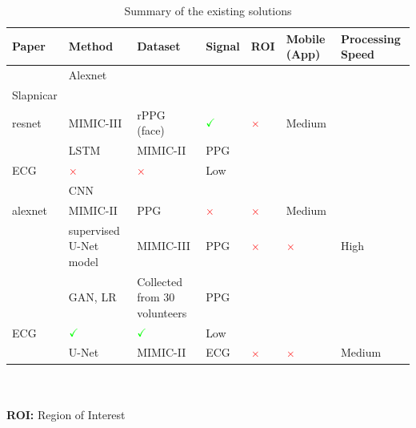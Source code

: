 \documentclass[journal,twoside,web]{ieeecolor}
\begin{document}
\begin{table}[h]
    \centering
    \caption{Summary of the existing solutions}
    \label{tab: rel-work}
    \begin{tabular}{p{0.5cm}|p{1.0cm}|p{1.3cm}|p{0.6cm}|p{0.4cm}|p{0.9cm}|p{1.1cm}}
        \toprule
        \centering
         \centering \textbf{Paper} & \centering \textbf{Method} & \centering \textbf{Dataset} & \textbf{Signal} & \textbf{ROI} & \textbf{Mobile (App)} & \textbf{Processing Speed}\tabularnewline
         \hline
         
         \centering \cite{b1} & \centering Alexnet\\Slapnicar\\resnet & \centering MIMIC-III & \centering rPPG (face) & \centering $\textcolor{green}{\checkmark}$ & \centering $\textcolor{red}{\times}$  & \centering Medium \tabularnewline
         \hline
         
         \centering \cite{b2} & \centering LSTM & \centering MIMIC-II & \centering PPG\\ECG & \centering $\textcolor{red}{\times}$ & \centering $\textcolor{red}{\times}$ & \centering Low \tabularnewline
         \hline
         
         \centering \cite{b5} & \centering CNN\\alexnet & \centering MIMIC-II & \centering PPG & \centering $\textcolor{red}{\times}$ & \centering $\textcolor{red}{\times}$ & \centering Medium \tabularnewline
         \hline
         
         \centering \cite{b13} & \centering supervised U-Net model & \centering MIMIC-III & \centering PPG & \centering $\textcolor{red}{\times}$ & \centering $\textcolor{red}{\times}$ & \centering High \tabularnewline
         \hline

         \centering \cite{b10} & \centering GAN, LR & \centering Collected from 30 volunteers & \centering PPG \\ECG & \centering $\textcolor{green}{\checkmark}$ & \centering $\textcolor{green}{\checkmark}$ & \centering Low \tabularnewline
         \hline
        
         \centering \cite{b30} & \centering U-Net & \centering MIMIC-II & \centering ECG & \centering $\textcolor{red}{\times}$ & \centering $\textcolor{red}{\times}$ & \centering Medium \tabularnewline
         \hline
         
    \end{tabular}
    \\
    \vspace{10pt}
    \\ \textbf{ROI:} Region of Interest
\end{table}
\end{document}
